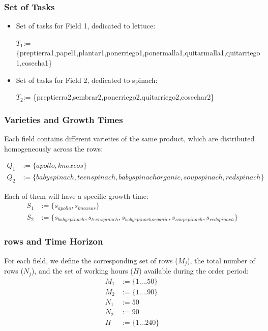\subsubsection{Set of Tasks}
\begin{itemize}
    \item Set of tasks for Field 1, dedicated to lettuce:

        $T_1$:= \{preptierra1,papel1,plantar1,ponerriego1,ponermalla1,quitarmalla1,quitarriego1,cosecha1\}    
    \item Set of tasks for Field 2, dedicated to spinach:

        $T_2$:= \{preptierra2,sembrar2,ponerriego2,quitarriego2,cosechar2\}
\end{itemize}

\subsubsection{Varieties and Growth Times}

Each field contains different varieties of the same product, which are distributed homogeneously across the rows:


\[\begin{aligned}
        Q_1&:=\{apollo, knoxcos\}\\
        Q_2&:=\{babyspinach, teenspinach, babyspinachorganic, soupspinach, redspinach\}
    \end{aligned}\]

Each of them will have a specific growth time:
\[\begin{aligned}
        S_1&:=\{s_{apollo},s_{knoxcos}\}\\
        S_2&:=\{s_{babyspinach}, s_{teenspinach}, s_{babyspinachorganic}, s_{soupspinach}, s_{redspinach}\}
    \end{aligned}\]



\subsubsection{rows and Time Horizon}

For each field, we define the corresponding set of rows ($M_j$), the total number of rows ($N_j$),  
and the set of working hours ($H$) available during the order period:
    \[\begin{aligned}
        M_1&:=\{1....50\}\\
        M_2&:=\{1....90\}\\
        N_1&:=50\\
        N_2&:=90\\
        H&:=\{1...240\}
    \end{aligned}\]

